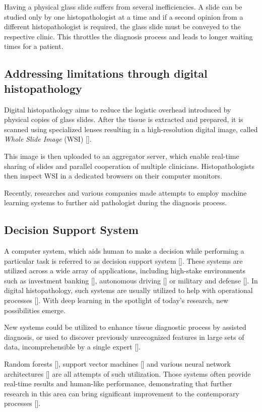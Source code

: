 Having a physical glass slide suffers from several inefficiencies. A slide can be studied only by one histopathologist at a time and if a second opinion from a different histopathologist is required, the glass slide must be conveyed to the respective clinic. This throttles the diagnosis process and leads to longer waiting times for a patient.

\subsection{Addressing limitations through digital histopathology}

Digital histopathology aims to reduce the logistic overhead introduced by physical copies of glass slides. After the tissue is extracted and prepared, it is scanned using specialized lenses resulting in a high-resolution digital image, called \emph{Whole Slide Image} (WSI) [].

This image is then uploaded to an aggregator server, which enable real-time sharing of slides and parallel cooperation of multiple clinicians. Histopathologists then inspect WSI in a dedicated browsers on their computer monitors.

Recently, researches and various companies made attempts to employ machine learning systems to further aid pathologist during the diagnosis process. 

\subsection{Decision Support System}

A computer system, which aids human to make a decision while performing a particular task is referred to as decision support system []. These systems are utilized across a wide array of applications, including high-stake environments such as investment banking [], autonomous driving [] or military and defense []. In digital histopathology, such systems are usually utilized to help with operational processes []. With deep learning in the spotlight of today's research, new possibilities emerge.

New systems could be utilized to enhance tissue diagnostic process by assisted diagnosis, or used to discover previously unrecognized features in large sets of data, incomprehensible by a single expert [].


Random forests [], support vector machines [] and various neural network architectures [] are all attempts of such utilization. Those systems often provide real-time results and human-like performance, demonstrating that further research in this area can bring significant improvement to the contemporary processes [].

